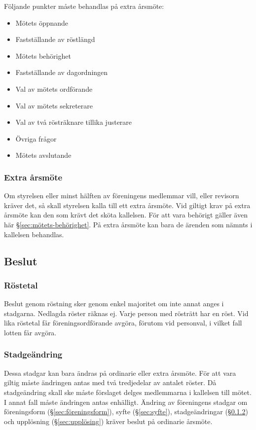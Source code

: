 Följande punkter måste behandlas på extra årsmöte:
\begin{itemize}
    \item Mötets öppnande
    \item Fastställande av röstlängd
    \item Mötets behörighet
    \item Fastställande av dagordningen
    \item Val av mötets ordförande
    \item Val av mötets sekreterare
    \item Val av två rösträknare tillika justerare
    \item Övriga frågor
    \item Mötets avslutande
\end{itemize}

\subsubsection{Extra årsmöte}
Om styrelsen eller minst hälften av föreningens medlemmar vill, eller revisorn kräver det, så skall styrelsen kalla till ett extra årsmöte. Vid giltigt krav på extra årsmöte kan den som krävt det sköta kallelsen. För att vara behörigt gäller även här §\ref{sec:mötets-behörighet}. På extra årsmöte kan bara de ärenden som nämnts i kallelsen behandlas.

\subsection{Beslut}

\subsubsection{Röstetal}
Beslut genom röstning sker genom enkel majoritet om inte annat anges i stadgarna. Nedlagda röster räknas ej. Varje person med rösträtt har en röst. Vid lika röstetal får föreningsordförande avgöra, förutom vid personval, i vilket fall lotten får avgöra.

\subsubsection{Stadgeändring} \label{sec:stadgeändringar}
Dessa stadgar kan bara ändras på ordinarie eller extra årsmöte. För att vara giltig måste ändringen antas med två tredjedelar av antalet röster. Då stadgeändring skall ske måste förslaget delges medlemmarna i kallelsen till mötet. I annat fall måste ändringen antas enhälligt. Ändring av föreningens stadgar om föreningsform (§\ref{sec:föreningsform}), syfte (§\ref{sec:syfte}), stadgeändringar (§\ref{sec:stadgeändringar}) och upplösning (§\ref{sec:upplösing}) kräver beslut på ordinarie årsmöte.

